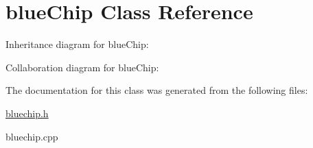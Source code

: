 \hypertarget{classblueChip}{}\section{blue\+Chip Class Reference}
\label{classblueChip}


Inheritance diagram for blue\+Chip\+:


Collaboration diagram for blue\+Chip\+:


The documentation for this class was generated from the following files\+:\begin{DoxyCompactItemize}
\item 
\hyperlink{bluechip_8h}{bluechip.\+h}\item 
bluechip.\+cpp\end{DoxyCompactItemize}
